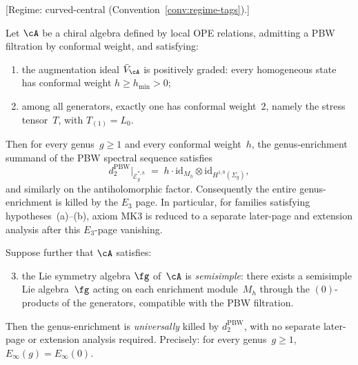 \begin{theorem}
\label{thm:pbw-universal-semisimple}
\textup{[Regime: curved-central
\textup{(}Convention~\textup{\ref{conv:regime-tags})}.]}

Let $\cA$ be a chiral algebra defined by local OPE relations,
admitting a PBW filtration by conformal weight, and satisfying:
\begin{enumerate}[label=\textup{(\alph*)}]
\item the augmentation ideal $\bar{V}_\cA$ is
  positively graded: every homogeneous state has
  conformal weight $h \geq h_{\min} > 0$;
\item among all generators, exactly one has conformal
  weight~$2$, namely the stress tensor~$T$, with
  $T_{(1)} = L_0$.
\end{enumerate}
Then for every genus~$g \geq 1$ and every conformal
weight~$h$, the genus-enrichment summand of the PBW
spectral sequence satisfies
\[
d_2^{\mathrm{PBW}}\big|_{\mathcal{E}_g^{*,h}}
\;=\;
h \cdot \mathrm{id}_{M_h}
\otimes
\mathrm{id}_{H^{1,0}(\Sigma_g)},
\]
and similarly on the antiholomorphic factor.  Consequently the entire
genus-enrichment is killed by the $E_3$ page.  In particular, for
families satisfying hypotheses~\textup{(a)}--\textup{(b)}, axiom
\textup{MK3} is reduced to a separate later-page and extension analysis
after this $E_3$-page vanishing.

\smallskip
Suppose further that $\cA$ satisfies:
\begin{enumerate}[label=\textup{(\alph*)}]
\setcounter{enumi}{2}
\item the Lie symmetry algebra $\fg$ of~$\cA$ is
  \emph{semisimple}: there exists a semisimple Lie
  algebra~$\fg$ acting on each enrichment module~$M_h$ through
  the $(0)$-products of the generators, compatible with the
  PBW filtration.
\end{enumerate}
Then the genus-enrichment is \emph{universally} killed by
$d_2^{\mathrm{PBW}}$, with no separate later-page or extension
analysis required.  Precisely: for every genus~$g \geq 1$,
$E_\infty(g) = E_\infty(0)$.
\end{theorem}

